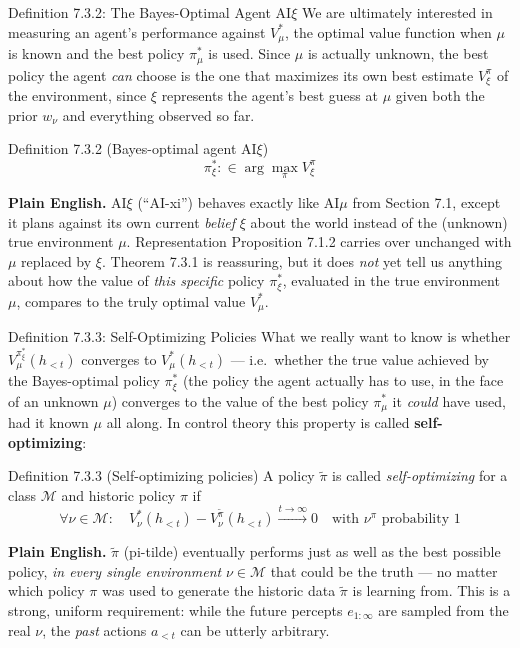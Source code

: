 \documentclass[aspectratio=169,10pt]{beamer}
\newcommand{\Mcal}{\mathcal{M}}
\begin{document}
\begin{frame}{Definition 7.3.2: The Bayes-Optimal Agent AI$\xi$}
  We are ultimately interested in measuring an agent's performance against
  $V_\mu^*$, the optimal value function when $\mu$ is known and the best
  policy $\pi_\mu^*$ is used. Since $\mu$ is actually unknown, the best
  policy the agent \emph{can} choose is the one that maximizes its own best
  estimate $V_\xi^\pi$ of the environment, since $\xi$ represents the
  agent's best guess at $\mu$ given both the prior $w_\nu$ and everything
  observed so far.
  \begin{block}{Definition 7.3.2 (Bayes-optimal agent AI$\xi$)}
    \[
      \pi_\xi^* :\in \arg\max_\pi V_\xi^\pi
    \]
  \end{block}
  \textbf{Plain English.} AI$\xi$ (``AI-xi'') behaves exactly like AI$\mu$
  from Section 7.1, except it plans against its own current \emph{belief}
  $\xi$ about the world instead of the (unknown) true environment $\mu$.
  Representation Proposition 7.1.2 carries over unchanged with $\mu$
  replaced by $\xi$. Theorem 7.3.1 is reassuring, but it does \emph{not} yet
  tell us anything about how the value of \emph{this specific} policy
  $\pi_\xi^*$, evaluated in the true environment $\mu$, compares to the
  truly optimal value $V_\mu^*$.
\end{frame}

\begin{frame}{Definition 7.3.3: Self-Optimizing Policies}
  What we really want to know is whether $V_\mu^{\pi_\xi^*}(h_{<t})$
  converges to $V_\mu^*(h_{<t})$ --- i.e.\ whether the true value achieved
  by the Bayes-optimal policy $\pi_\xi^*$ (the policy the agent actually
  has to use, in the face of an unknown $\mu$) converges to the value of the
  best policy $\pi_\mu^*$ it \emph{could} have used, had it known $\mu$ all
  along. In control theory this property is called \textbf{self-optimizing}:
  \begin{block}{Definition 7.3.3 (Self-optimizing policies)}
    A policy $\tilde\pi$ is called \emph{self-optimizing} for a class
    $\Mcal$ and historic policy $\pi$ if
    \[
      \forall\nu\in\Mcal:\quad V_\nu^*(h_{<t}) - V_\nu^{\tilde\pi}(h_{<t})
      \xrightarrow{t\to\infty} 0 \quad\text{with } \nu^\pi\text{ probability 1}
    \]
  \end{block}
  \textbf{Plain English.} $\tilde\pi$ (pi-tilde) eventually performs just as
  well as the best possible policy, \emph{in every single environment}
  $\nu\in\Mcal$ that could be the truth --- no matter which policy $\pi$ was
  used to generate the historic data $\tilde\pi$ is learning from. This is a
  strong, uniform requirement: while the future percepts $e_{1:\infty}$ are
  sampled from the real $\nu$, the \emph{past} actions $a_{<t}$ can be
  utterly arbitrary.
\end{frame}
\end{document}
